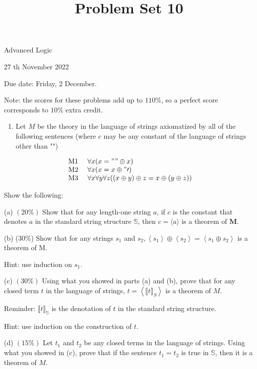 \documentclass[10pt]{article}
\title{Problem Set 10 }
\author{}
\date{}
\begin{document}
\maketitle
Advanced Logic

27 th November 2022

Due date: Friday, 2 December.

Note: the scores for these problems add up to \(110 \%\), so a perfect score corresponds to \(10 \%\) extra credit.

\begin{enumerate}
  \item Let \(M\) be the theory in the language of strings axiomatized by all of the following sentences (where \(c\) may be any constant of the language of strings other than "")
\end{enumerate}

\[
\begin{array}{ll}
\text { M1 } & \forall x(x=" " \oplus x) \\
\text { M2 } & \forall x(x=x \oplus " \prime) \\
\text { M3 } & \forall x \forall y \forall z((x \oplus y) \oplus z=x \oplus(y \oplus z))
\end{array}
\]

Show the following:

(a) \((20 \%)\) Show that for any length-one string \(a\), if \(c\) is the constant that denotes \(a\) in the standard string structure \(\mathbb{S}\), then \(c=\langle a\rangle\) is a theorem of \(\mathbf{M}\).

(b) (30\%) Show that for any strings \(s_{1}\) and \(s_{2},\left\langle s_{1}\right\rangle \oplus\left\langle s_{2}\right\rangle=\left\langle s_{1} \oplus s_{2}\right\rangle\) is a theorem of M.

Hint: use induction on \(s_{1}\).

(c) \((30 \%)\) Using what you showed in parts (a) and (b), prove that for any closed term \(t\) in the language of strings, \(t=\left\langle\llbracket t \rrbracket_{S}\right\rangle\) is a theorem of \(M\).

Reminder: \(\llbracket t \rrbracket_{\mathbb{S}}\) is the denotation of \(t\) in the standard string structure.

Hint: use induction on the construction of \(t\).

(d) \((15 \%)\) Let \(t_{1}\) and \(t_{2}\) be any closed terms in the language of strings. Using what you showed in (c), prove that if the sentence \(t_{1}=t_{2}\) is true in \(\mathbb{S}\), then it is a theorem of \(M\).
\end{document}
